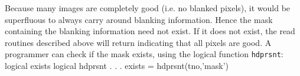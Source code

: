 Because many images are completely good (i.e. no blanked pixels),
it would be superfluous to always carry around blanking information.
Hence the
mask containing the blanking information need not exist. If it does not
exist, the read routines described above will return indicating that all
pixels are good.
A programmer can check if the mask exists, using the logical function
{\tt hdprsnt}:
{\ninepoint\begintt
     logical exists
     logical hdprsnt
          .
          .
          .
     exists = hdprsnt(tno,'mask')
\endtt}
